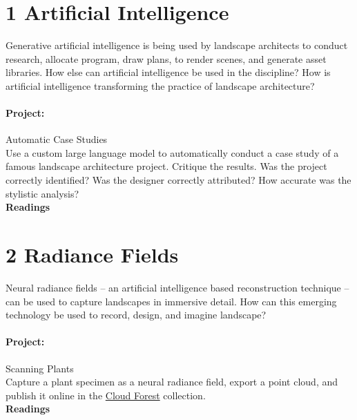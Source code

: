 \documentclass[11pt,article,oneside]{memoir}
\begin{document}

\section{1 Artificial Intelligence}

Generative artificial intelligence is being used by landscape architects 
to conduct research,
allocate program, 
draw plans, 
to render scenes,
and generate asset libraries.
How else can artificial intelligence be used in the discipline?
How is artificial intelligence transforming 
the practice of landscape architecture?

\paragraph{Project:} Automatic Case Studies \\

\noindent
Use a custom large language model 
to automatically conduct a case study 
of a famous landscape architecture project. 
Critique the results.
Was the project correctly identified?
Was the designer correctly attributed?
How accurate was the stylistic analysis?
\\

\noindent
\textbf{Readings}
\nocite{*}
\setlength{}
\printbibliography[keyword=ai, heading=none]

\section{2 Radiance Fields}

Neural radiance fields 
-- an artificial intelligence based reconstruction technique -- 
can be used to capture landscapes in immersive detail. 
How can this emerging technology be used to 
record, design, and imagine landscape? 

\paragraph{Project:} Scanning Plants\\

\noindent
Capture a plant specimen as a neural radiance field,
export a point cloud, and publish it online in the 
\href{https://xyz.cct.lsu.edu/cloud-forest/}{Cloud Forest} collection.
\\

\noindent
\textbf{Readings}
\nocite{*}
\setlength{}
\printbibliography[keyword=radiance-fields, heading=none]
\end{document}
